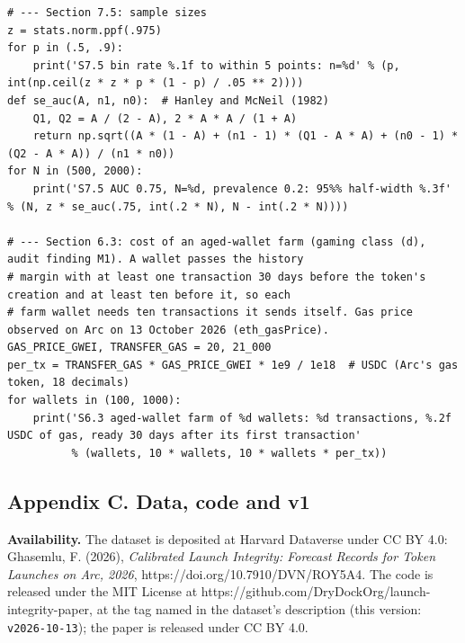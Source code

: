 \begin{verbatim}
# --- Section 7.5: sample sizes
z = stats.norm.ppf(.975)
for p in (.5, .9):
    print('S7.5 bin rate %.1f to within 5 points: n=%d' % (p, int(np.ceil(z * z * p * (1 - p) / .05 ** 2))))
def se_auc(A, n1, n0):  # Hanley and McNeil (1982)
    Q1, Q2 = A / (2 - A), 2 * A * A / (1 + A)
    return np.sqrt((A * (1 - A) + (n1 - 1) * (Q1 - A * A) + (n0 - 1) * (Q2 - A * A)) / (n1 * n0))
for N in (500, 2000):
    print('S7.5 AUC 0.75, N=%d, prevalence 0.2: 95%% half-width %.3f' % (N, z * se_auc(.75, int(.2 * N), N - int(.2 * N))))

# --- Section 6.3: cost of an aged-wallet farm (gaming class (d), audit finding M1). A wallet passes the history
# margin with at least one transaction 30 days before the token's creation and at least ten before it, so each
# farm wallet needs ten transactions it sends itself. Gas price observed on Arc on 13 October 2026 (eth_gasPrice).
GAS_PRICE_GWEI, TRANSFER_GAS = 20, 21_000
per_tx = TRANSFER_GAS * GAS_PRICE_GWEI * 1e9 / 1e18  # USDC (Arc's gas token, 18 decimals)
for wallets in (100, 1000):
    print('S6.3 aged-wallet farm of %d wallets: %d transactions, %.2f USDC of gas, ready 30 days after its first transaction'
          % (wallets, 10 * wallets, 10 * wallets * per_tx))
\end{verbatim}

\subsection{Appendix C. Data, code and v1}\label{appendix-c.-data-code-and-v1}

\textbf{Availability.} The dataset is deposited at Harvard Dataverse under CC BY 4.0: Ghasemlu, F. (2026), \emph{Calibrated Launch Integrity: Forecast Records for Token Launches on Arc, 2026}, https://doi.org/10.7910/DVN/ROY5A4. The code is released under the MIT License at https://github.com/DryDockOrg/launch-integrity-paper, at the tag named in the dataset's description (this version: \texttt{v2026-10-13}); the paper is released under CC BY 4.0.

